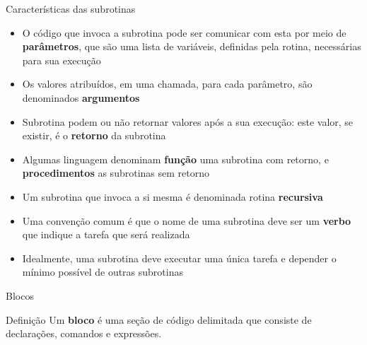 \begin{frame}[fragile]{Características das subrotinas}

    \begin{itemize}

        \item O código que invoca a subrotina pode ser comunicar com esta por meio de 
            \textbf{parâmetros}, que são uma lista de variáveis, definidas pela rotina, necessárias
            para sua execução

        \item Os valores atribuídos, em uma chamada, para cada parâmetro, são denominados
            \textbf{argumentos}

        \item Subrotina podem ou não retornar valores após a sua execução: este valor, se existir,              é o \textbf{retorno} da subrotina

        \item Algumas linguagem denominam \textbf{função} uma subrotina com retorno, e 
            \textbf{procedimentos} as subrotinas sem retorno

        \item Um subrotina que invoca a si mesma é denominada rotina \textbf{recursiva}

        \item Uma convenção comum é que o nome de uma subrotina deve ser um \textbf{verbo} que
            indique a tarefa que será realizada

        \item Idealmente, uma subrotina deve executar uma única tarefa e depender o mínimo possível
            de outras subrotinas
    \end{itemize}

\end{frame}

\begin{frame}[fragile]{Blocos}

    \begin{block}{Definição}
        Um \textbf{bloco} é uma seção de código delimitada que consiste de declarações, comandos
            e expressões.
    \end{block}

\end{frame}

